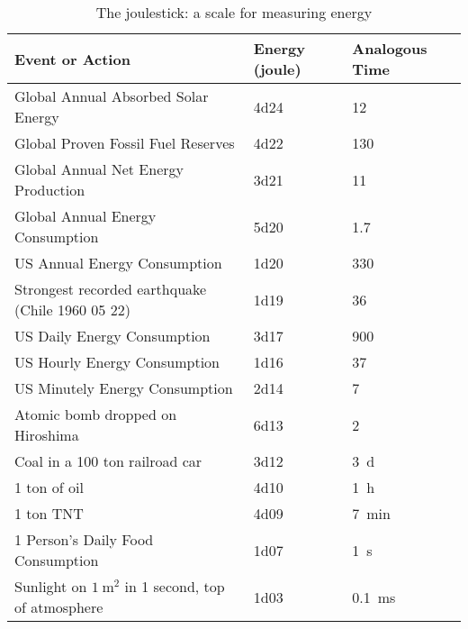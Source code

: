 \begin{table}
\begin{center}
		\caption{The joulestick: a scale for measuring energy} \label{tab:joulestick}
		\begin{tabular}{@{}lll@{}} \toprule
			Event or Action & Energy (\si{joule}) & Analogous Time\\ \midrule
			Global Annual Absorbed Solar Energy								& \num{4d24}	&\SI{12}{\giga\year}\\
			Global Proven Fossil Fuel Reserves								& \num{4d22}	&\SI{130}{\mega\year}\\
			Global Annual Net Energy Production								& \num{3d21}	&\SI{11}{\mega\year}\\
			Global Annual Energy Consumption	  							& \num{5d20}	&\SI{1.7}{\mega\year}\\
			US Annual Energy Consumption	      							& \num{1d20}	&\SI{330}{\kilo\year}\\
			Strongest recorded earthquake (Chile 1960 05 22)	& \num{1d19}	&\SI{36}{\kilo\year}\\
			US Daily Energy Consumption	        							& \num{3d17}	&\SI{900}{\year}\\
			US Hourly Energy Consumption	      							& \num{1d16}	&\SI{37}{\year}\\
			US Minutely Energy Consumption	    							& \num{2d14}	&\SI{7}{\month}\\
			Atomic bomb dropped on Hiroshima	  							& \num{6d13}	&\SI{2}{\month}\\
			Coal in a 100 ton railroad car	    							& \num{3d12}	&\SI{3}{\day}\\
			1 ton of oil	                      							& \num{4d10}	&\SI{1}{\hour}\\
			1 ton TNT	                          							& \num{4d09}	&\SI{7}{\minute}\\
			1 Person's Daily Food Consumption	  							& \num{1d07}	&\SI{1}{\second}\\
			Sunlight on $\SI{1}{\meter\squared}$ in 1 second, top of atmosphere	  & \num{1d03}	&\SI{0.1}{\milli\second}\\
\bottomrule
\end{tabular}
\end{center}
\end{table}


